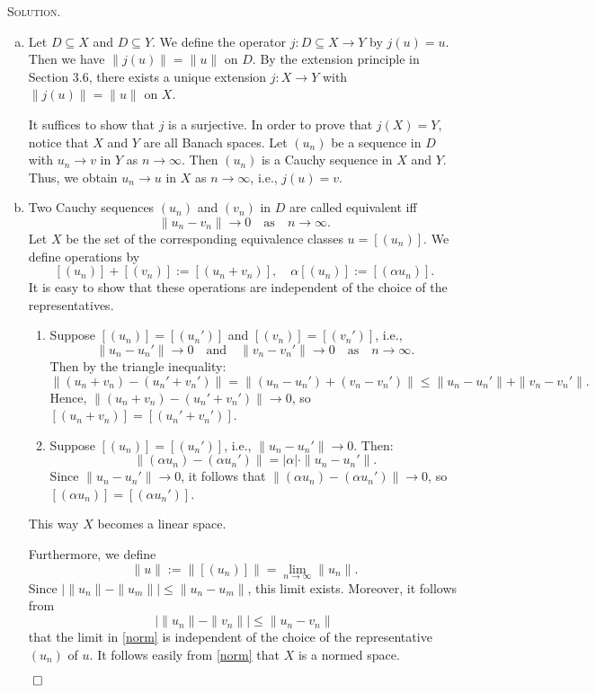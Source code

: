 \documentclass[12pt, a4paper, oneside]{ctexart}
\newenvironment{solution}{%
	\par\noindent\textsc{Solution. }\ignorespaces
}{%
	\hfill$\qed$\par
}
\begin{document}
	\begin{solution}
		\begin{enumerate}[a.]
			\item Let $D \subseteq X$ and $D \subseteq Y$. We define the operator $j: D \subseteq X \to Y$ by $j(u) = u$. Then we have $\|j(u)\| = \|u\|$ on $D$. By the extension principle in Section 3.6, there exists a unique extension $j: X \to Y$ with $\|j(u)\| = \|u\|$ on $X$.
			
			It suffices to show that $j$ is a surjective. In order to prove that $j(X) = Y$, notice that $X$ and $Y$ are all Banach spaces. Let $(u_n)$ be a sequence in $D$ with $u_n \to v$ in $Y$ as $n \to \infty$. Then $(u_n)$ is a Cauchy sequence in $X$ and $Y$. Thus, we obtain $u_n \to u$ in $X$ as $n \to \infty$, i.e., $j(u) = v$.
			\item Two Cauchy sequences \((u_n)\) and \((v_n)\) in \(D\) are called equivalent iff
			\[
			\|u_n - v_n\| \to 0 \quad \text{as} \quad n \to \infty.
			\]
			Let \(X\) be the set of the corresponding equivalence classes \(u = [(u_n)]\). We define operations by
			\[
			[(u_n)] + [(v_n)] := [(u_n + v_n)], \quad \alpha [(u_n)] := [(\alpha u_n)].
			\]
			It is easy to show that these operations are independent of the choice of the representatives. 
			\begin{enumerate}[1.]

				\item Suppose \([(u_n)] = [(u_n')]\) and \([(v_n)] = [(v_n')]\), i.e.,  
				\[
				\|u_n - u_n'\| \to 0 \quad \text{and} \quad \|v_n - v_n'\| \to 0 \quad \text{as} \quad n \to \infty.
				\]  
				Then by the triangle inequality:  
				\[
				\|(u_n + v_n) - (u_n' + v_n')\| = \|(u_n - u_n') + (v_n - v_n')\| \leq \|u_n - u_n'\| + \|v_n - v_n'\|.
				\]  
				Hence, \(\|(u_n + v_n) - (u_n' + v_n')\| \to 0\), so \([(u_n + v_n)] = [(u_n' + v_n')]\).
				
				\item   
				Suppose \([(u_n)] = [(u_n')]\), i.e., \(\|u_n - u_n'\| \to 0\). Then:  
				\[
				\|(\alpha u_n) - (\alpha u_n')\| = |\alpha| \cdot \|u_n - u_n'\|.
				\]  
				Since \(\|u_n - u_n'\| \to 0\), it follows that \(\|(\alpha u_n) - (\alpha u_n')\| \to 0\), so \([(\alpha u_n)] = [(\alpha u_n')]\).
			\end{enumerate}
			This way \(X\) becomes a linear space.
			
			Furthermore, we define
			\begin{equation}
				\|u\|:=\|[(u_{n})]\| = \lim_{n \to \infty} \|u_n\|.\label{norm}
			\end{equation}
			Since \(|\|u_n\| - \|u_m\|| \leq \|u_n - u_m\|\), this limit exists. Moreover, it follows from
			\[
			|\|u_n\| - \|v_n\|| \leq \|u_n - v_n\|
			\]
			that the limit in \eqref{norm} is independent of the choice of the representative \((u_n)\) of \(u\). It follows easily from \eqref{norm} that \(X\) is a normed space.
			

\end{enumerate}
\end{solution}
\end{document}
